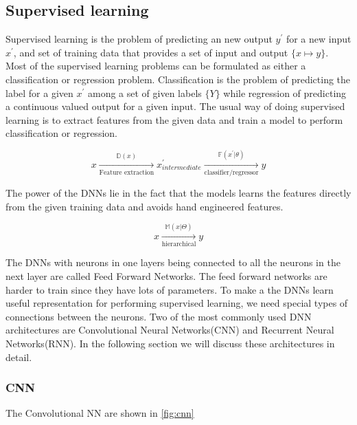 \documentclass[a4paper]{article}
\begin{document}
\subsection{Supervised  learning}   Supervised  learning   is   the  problem  of
predicting an new output $y^\prime$ for a new  input $x^\prime$,
and set of training  data that provides a  set of  input and output $\{x \mapsto
y\}$. Most of the supervised learning problems  can be  formulated  as either  a
classification   or  regression   problem.  Classification  is  the  problem  of
predicting the  label for a given $x^\prime$ among a set of given labels
$\{Y\}$  while regression  of predicting a continuous valued output for  a given
input. The usual way  of  doing supervised learning  is to extract features from
the given data and train a model to perform classification or regression.


\begin{equation*}
  x
  \xrightarrow[\text{Feature extraction}]{
    \mathbb{D}(x)
  }
  x^\prime
  _{intermediate}
  \xrightarrow[\text{classifier/regressor}]{
    \mathbb{F}(x^\prime | \theta)
  }
  y
\end{equation*}


The  power of the  DNNs lie in  the fact  that the  models learns  the  features
directly from the given training data and avoids hand  engineered features.


\begin{equation*}
  x \xrightarrow[ \text{hierarchical}] { \mathbb{M}(x | \Theta) } y
\end{equation*}


The DNNs  with neurons in one  layers being connected to all the neurons  in the
next  layer  are  called  Feed Forward Networks. The feed  forward networks  are
harder  to train since  they have lots  of parameters. To make  a the DNNs learn
useful representation for performing supervised learning,  we need special types
of  connections  between  the  neurons.  Two  of  the  most  commonly  used  DNN
architectures  are  Convolutional  Neural  Networks(CNN)  and  Recurrent  Neural
Networks(RNN). In the following section  we  will discuss these architectures in
detail.


\subsubsection{CNN}
The Convolutional NN are shown in \ref{fig:cnn}
\end{document}
